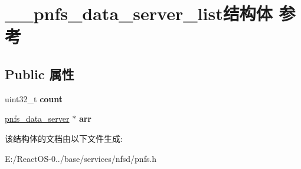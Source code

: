 \hypertarget{struct____pnfs__data__server__list}{}\section{\+\_\+\+\_\+pnfs\+\_\+data\+\_\+server\+\_\+list结构体 参考}
\label{struct____pnfs__data__server__list}
\subsection*{Public 属性}
\begin{DoxyCompactItemize}
\item 
\mbox{\label{struct____pnfs__data__server__list_a4ecb444cc5f6df14e3aa464633d3c78a}} 
uint32\+\_\+t {\bfseries count}
\item 
\mbox{\label{struct____pnfs__data__server__list_acd3cfaff05eafe216b8f9d72435e0f8c}} 
\hyperlink{struct____pnfs__data__server}{pnfs\+\_\+data\+\_\+server} $\ast$ {\bfseries arr}
\end{DoxyCompactItemize}


该结构体的文档由以下文件生成\+:\begin{DoxyCompactItemize}
\item 
E\+:/\+React\+O\+S-\/0../base/services/nfsd/pnfs.\+h\end{DoxyCompactItemize}
